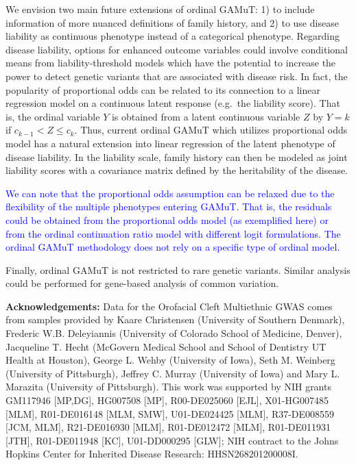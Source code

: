\documentclass[]{article}
\theoremstyle{definition}
\theoremstyle{definition}
\theoremstyle{definition}
\theoremstyle{remark}
\begin{document}
We envision two main future extensions of ordinal GAMuT: 1) to include
information of more nuanced definitions of family history, and 2) to use
disease liability as continuous phenotype instead of a categorical
phenotype. Regarding disease liability, options for enhanced outcome
variables could involve conditional means from liability-threshold
models which have the potential to increase the power to detect genetic
variants that are associated with disease risk. In fact, the popularity
of proportional odds can be related to its connection to a linear
regression model on a continuous latent response (e.g.~the liability
score). That is, the ordinal variable \(Y\) is obtained from a latent
continuous variable \(Z\) by \(Y=k\) if \(c_{k-1} < Z \leq c_k\). Thus,
current ordinal GAMuT which utilizes proportional odds model has a
natural extension into linear regression of the latent phenotype of
disease liability. In the liability scale, family history can then be
modeled as joint liability scores with a covariance matrix defined by
the heritability of the disease.

\textcolor{blue}{We can note that the proportional odds assumption can be relaxed due to the flexibility of the multiple phenotypes entering GAMuT. That is, the residuals could be obtained from the proportional odds model (as exemplified here) or from the ordinal continuation ratio model with different logit formulations. The ordinal GAMuT methodology does not rely on a specific type of ordinal model.}

Finally, ordinal GAMuT is not restricted to rare genetic variants.
Similar analysis could be performed for gene-based analysis of common
variation.

\textbf{Acknowledgements:} Data for the Orofacial Cleft Multiethnic GWAS
comes from samples provided by Kaare Christensen (University of Southern
Denmark), Frederic W.B. Deleyiannis (University of Colorado School of
Medicine, Denver), Jacqueline T. Hecht (McGovern Medical School and
School of Dentistry UT Health at Houston), George L. Wehby (University
of Iowa), Seth M. Weinberg (University of Pittsburgh), Jeffrey C. Murray
(University of Iowa) and Mary L. Marazita (University of Pittsburgh).
This work was supported by NIH grants GM117946 {[}MP,DG{]}, HG007508
{[}MP{]}, R00-DE025060 {[}EJL{]}, X01-HG007485 {[}MLM{]}, R01-DE016148
{[}MLM, SMW{]}, U01-DE024425 {[}MLM{]}, R37-DE008559 {[}JCM, MLM{]},
R21-DE016930 {[}MLM{]}, R01-DE012472 {[}MLM{]}, R01-DE011931 {[}JTH{]},
R01-DE011948 {[}KC{]}, U01-DD000295 {[}GLW{]}; NIH contract to the Johns
Hopkins Center for Inherited Disease Research: HHSN268201200008I.
\end{document}
